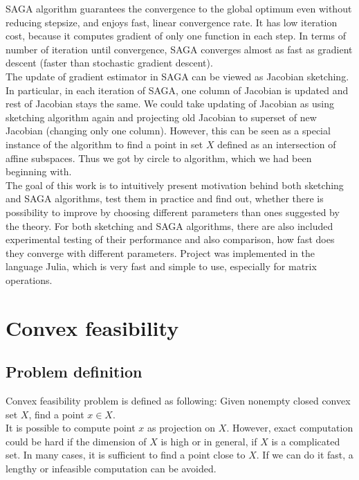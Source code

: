 \documentclass[11pt]{book}
\begin{document}
SAGA algorithm guarantees the convergence to the global optimum even without reducing stepsize, and enjoys fast, linear convergence rate. It has low iteration cost, because it computes gradient of only one function in each step. In terms of number of iteration until convergence, SAGA converges almost as fast as gradient descent (faster than stochastic gradient descent)\cite{SAGA}.\\

The update of gradient estimator in SAGA can be viewed as Jacobian sketching. In particular, in each iteration of SAGA, one column of Jacobian is updated and rest of Jacobian stays the same. We could take updating of Jacobian as using sketching algorithm again and projecting old Jacobian to superset of new Jacobian (changing only one column). However, this can be seen as a special instance of the algorithm to find a point in set $X$ defined as an intersection of affine subspaces. Thus we got by circle to algorithm, which we had been beginning with.\\

The goal of this work is to intuitively present motivation behind both sketching and SAGA algorithms, test them in practice and find out, whether there is possibility to improve by choosing different parameters than ones suggested by the theory. For both sketching and SAGA algorithms, there are also included experimental testing of their performance and also comparison, how fast does they converge with different parameters. Project was implemented in the language Julia, which is very fast and simple to use, especially for matrix operations.

\chapter{Convex feasibility}

\section{Problem definition}

Convex feasibility problem is defined as following: Given nonempty closed convex set $X$, find a point $x \in X.$\\

It is possible to compute point $x$ as projection on $X$. However, exact computation could be hard if the dimension of $X$ is high or in general, if $X$ is a complicated set. In many cases, it is sufficient to find a point close to $X$. If we can do it fast, a lengthy or infeasible computation can be avoided.\\
\end{document}
